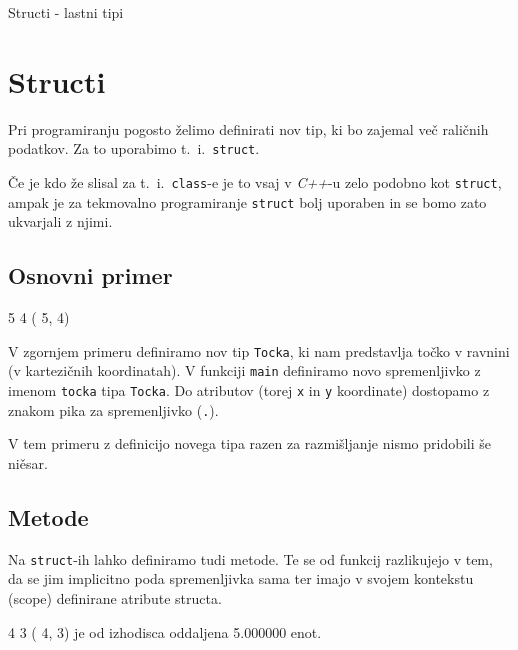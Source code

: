 
Structi - lastni tipi


\section{Structi}

Pri programiranju pogosto želimo definirati nov tip, ki bo zajemal več raličnih
podatkov. Za to uporabimo t.\ i.\ \verb+struct+.

\v Ce je kdo \v ze slisal za t.\ i.\ \verb+class+-e je to vsaj v {\em C++}-u zelo
podobno kot \verb+struct+, ampak je za tekmovalno programiranje \verb+struct+
bolj uporaben in se bomo zato ukvarjali z njimi.


\subsection{Osnovni primer}

\begin{examples}


\begin{inout}
5 4
\tcblower
( 5,  4)
\end{inout}

\end{examples}

V zgornjem primeru definiramo nov tip \verb+Tocka+, ki nam predstavlja to\v cko
v ravnini (v kartezi\v cnih koordinatah). V funkciji \verb+main+ definiramo novo
spremenljivko z imenom \verb+tocka+ tipa \verb+Tocka+. Do atributov (torej
\verb+x+ in \verb+y+ koordinate) dostopamo z znakom pika za spremenljivko
(\verb+.+).

V tem primeru z definicijo novega tipa razen za razmi\v sljanje nismo pridobili
\v se ni\v esar.


\subsection{Metode}

Na \verb+struct+-ih lahko definiramo tudi metode. Te se od funkcij razlikujejo v
tem, da se jim implicitno poda spremenljivka sama ter imajo v svojem kontekstu
(scope) definirane atribute structa.

\begin{examples}


\begin{inout}
4 3
\tcblower
( 4,  3) je od izhodisca oddaljena 5.000000 enot.
\end{inout}

\end{examples}

